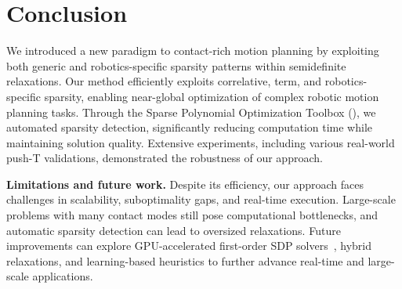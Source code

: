 

\section{Conclusion}
\label{sec:conclusion}

We introduced a new paradigm to contact-rich motion planning by exploiting both generic and robotics-specific sparsity patterns within semidefinite relaxations. Our method efficiently exploits correlative, term, and robotics-specific sparsity, enabling near-global optimization of complex robotic motion planning tasks. Through the Sparse Polynomial Optimization Toolbox (\spot), we automated sparsity detection, significantly reducing computation time while maintaining solution quality. Extensive experiments, including various real-world push-T validations, demonstrated the robustness of our approach. 

\textbf{Limitations and future work.} Despite its efficiency, our approach faces challenges in scalability, suboptimality gaps, and real-time execution. Large-scale problems with many contact modes still pose computational bottlenecks, and automatic sparsity detection can lead to oversized relaxations. Future improvements can explore GPU-accelerated first-order SDP solvers~\cite{kang2024wafr-strom}, hybrid relaxations, and learning-based heuristics to further advance real-time and large-scale applications.